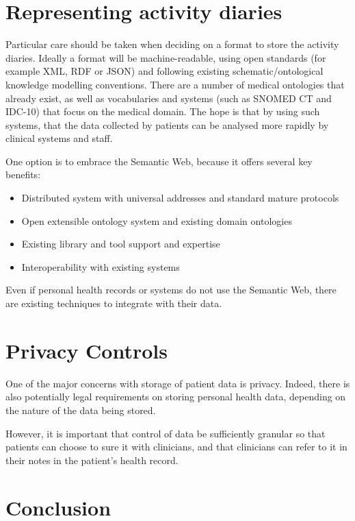 \documentclass{chi-ext}
\begin{document}
\section{Representing activity diaries}

Particular care should be taken when deciding on a format to store the activity diaries. Ideally
a format will be machine-readable, using open standards (for example XML, RDF or JSON) and
following existing schematic/ontological knowledge modelling conventions. There are a 
number of medical ontologies that already exist, as well as vocabularies and systems (such as
SNOMED CT \cite{stearns2001snomed} and IDC-10) that focus on the medical domain. The hope is that by using
such systems, that the data collected by patients can be analysed more rapidly by clinical systems
and staff.

One option is to embrace the Semantic Web, because it offers several key benefits:

\begin{itemize}

\item Distributed system with universal addresses and standard mature protocols
\item Open extensible ontology system and existing domain ontologies
\item Existing library and tool support and expertise
\item Interoperability with existing systems

\end{itemize}
 
Even if personal health records or systems do not use the Semantic Web, there are existing
techniques to integrate with their data.

\section{Privacy Controls}

One of the major concerns with storage of patient data is privacy. Indeed, there is also potentially
legal requirements on storing personal health data, depending on the nature of the data being
stored.

However, it is important that control of data be sufficiently granular so that patients can choose
to sure it with clinicians, and that clinicians can refer to it in their notes in the patient's health
record.


\section{Conclusion}
\end{document}
